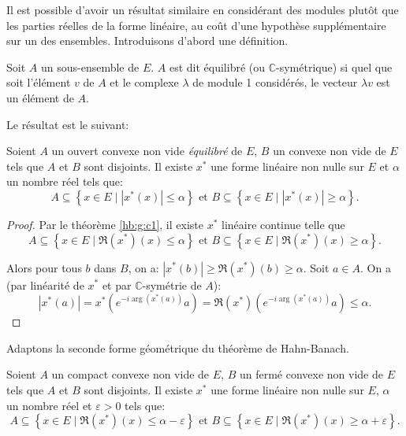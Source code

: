 Il est possible d'avoir un résultat similaire en considérant
des modules plutôt que les parties réelles de la forme linéaire,
au coût d'une hypothèse supplémentaire sur un des ensembles.
Introduisons d'abord une définition.

\begin{df}
  Soit $A$ un sous-ensemble de $E$. $A$ est dit équilibré
  (ou $\mathbb{C}$-symétrique) si quel que soit
  l'élément $v$ de $A$ et le complexe $\lambda$ de module 1 considérés, le vecteur
  $\lambda{}v$ est un élément de $A$.
\end{df}

Le résultat est le suivant:

\begin{cor}\label{hb:g:cc1}
  Soient $A$ un ouvert convexe non vide \emph{équilibré} de $E$, $B$ un
  convexe non vide de $E$ tels que $A$ et $B$ sont disjoints. Il existe
  $x^*$ une forme linéaire non nulle sur $E$ et $\alpha$ un nombre réel tels que:
  $$A\subseteq \left\{x\in E\mid |x^*(x)| \leq \alpha\right\} \mbox{ et }
  B\subseteq \left\{x\in E\mid |x^*(x)| \geq \alpha\right\}. $$
\end{cor}


\begin{proof}

  Par le théorème \ref{hb:g:c1}, il existe $x^*$ linéaire continue telle que
  $$A\subseteq \left\{x\in E\mid \Re(x^*)(x) \leq \alpha\right\} \mbox{ et }
  B\subseteq \left\{x\in E\mid \Re(x^*)(x) \geq \alpha\right\}. $$

  Alors pour tous $b$ dans $B$,
  on a: $|x^*(b)|\geq \Re(x^*)(b) \geq \alpha$.
  Soit $a\in A$. On a (par linéarité de $x^*$ et par $\mathbb{C}$-symétrie
  de $A$):
  $$|x^*(a)| = x^*(e^{-i\arg(x^*(a))}a) =
  \Re(x^*)(e^{-i\arg(x^*(a))}a)\leq \alpha.$$
\end{proof}

Adaptons la seconde forme géométrique du théorème de Hahn-Banach.
\begin{thm}
  Soient $A$ un compact convexe non vide de $E$, $B$ un fermé
  convexe non vide de $E$ tels que $A$ et $B$ sont disjoints. Il existe
  $x^*$ une forme linéaire non nulle sur $E$, $\alpha$ un nombre réel et
  $\varepsilon > 0$ tels que:
  $$A\subseteq \left\{x\in E\mid \Re(x^*)(x) \leq \alpha-\varepsilon\right\}
  \mbox{ et }
  B\subseteq \left\{x\in E\mid \Re(x^*)(x) \geq \alpha+\varepsilon\right\}. $$
\end{thm}

